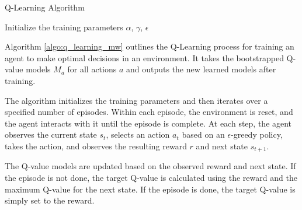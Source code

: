 \begin{algorithm}[ht]
  \caption{Q-Learning Algorithm}
  \label{algo:q_learning_mw}
  \SetAlgoLined
  Initialize the training parameters $\alpha$, $\gamma$, $\epsilon$\;
\end{algorithm}

Algorithm \ref{algo:q_learning_mw} outlines the Q-Learning process for training an agent to make optimal decisions in an environment. It takes the bootstrapped Q-value models $M_a$ for all actions $a$ and outputs the new learned models after training.

The algorithm initializes the training parameters and then iterates over a specified number of episodes. Within each episode, the environment is reset, and the agent interacts with it until the episode is complete. At each step, the agent observes the current state $s_t$, selects an action $a_t$ based on an $\epsilon$-greedy policy, takes the action, and observes the resulting reward $r$ and next state $s_{t+1}$.

The Q-value models are updated based on the observed reward and next state. If the episode is not done, the target Q-value is calculated using the reward and the maximum Q-value for the next state. If the episode is done, the target Q-value is simply set to the reward.

